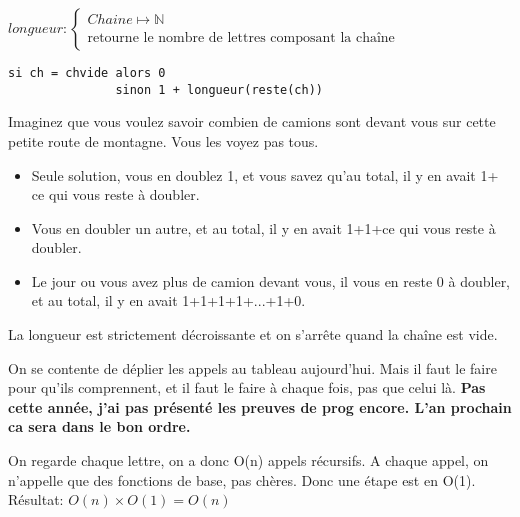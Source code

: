 \documentclass[10pt]{article}\usepackage[correction,nu]{esial}
\begin{document}
\begin{Question}
  $longueur: \left\{
    \begin{array}{l}
      Chaine\mapsto \mathbb{N}\\
      \text{retourne le nombre de lettres composant la chaîne}
    \end{array}\right.$
\end{Question}
\begin{Reponse}
  \begin{Verbatim}[label=longueur(ch)]
si ch = chvide alors 0
               sinon 1 + longueur(reste(ch))    
  \end{Verbatim}
  \begin{description}
    \item
    \item[Idée pour trouver comment faire] Imaginez que vous voulez savoir
      combien de camions sont devant vous sur cette petite route de
      montagne. Vous les voyez pas tous.
      \begin{itemize}
      \item Seule solution, vous en doublez 1, et vous savez qu'au total, il y
        en avait 1+ ce qui vous reste à doubler.
      \item  Vous en doubler un autre, et au total, il y en avait 1+1+ce qui
        vous reste à doubler.
      \item Le jour ou vous avez plus de camion devant vous, il vous en reste 0
        à doubler, et au total, il y en avait 1+1+1+1+...+1+0.
      \end{itemize}
  \item[Terminaison:] La longueur est strictement décroissante et on s'arrête
    quand la chaîne est vide.
  \item[Correction:] On se contente de déplier les appels au tableau
    aujourd'hui. Mais il faut le faire pour qu'ils comprennent, et il faut le
    faire à chaque fois, pas que celui là. \textbf{Pas cette année, j'ai pas
      présenté les preuves de prog encore. L'an prochain ca sera dans le bon
      ordre.} 
  \item[Complexité:] On regarde chaque lettre, on a donc O(n) appels
    récursifs. A chaque appel, on n'appelle que des fonctions de base, pas
    chères. Donc une étape est en O(1). Résultat: $O(n)\times O(1)=O(n)$
  \end{description}
\end{Reponse}
\end{document}
